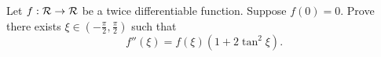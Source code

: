 Let $\displaystyle{f:{\cal R} \to {\cal R}}$ be a twice differentiable function. Suppose  $\displaystyle{f\left( 0 \right) = 0}$. Prove there exists $\displaystyle{\xi  \in \left( { - \frac{\pi }{2},\frac{\pi }{2}} \right)}$ such that \[\displaystyle{f''\left( \xi  \right) = f\left( \xi  \right)\left( {1 + 2{{\tan }^2}\xi } \right)}.\]
